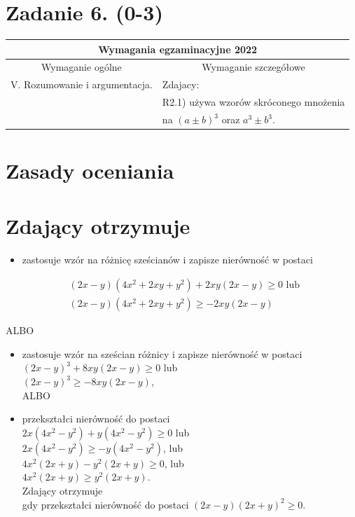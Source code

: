\documentclass[10pt]{article}
\begin{document}
\section*{Zadanie 6. (0-3)}
\begin{center}
\begin{tabular}{|l|l|}
\hline
\multicolumn{2}{|c|}{Wymagania egzaminacyjne 2022} \\
\hline
\multicolumn{1}{|c|}{Wymaganie ogólne} & \multicolumn{1}{c|}{Wymaganie szczegółowe} \\
\hline
V. Rozumowanie i argumentacja. & Zdajacy: \\
 & R2.1) używa wzorów skróconego mnożenia \\
 & na $(a \pm b)^{3}$ oraz $a^{3} \pm b^{3}$. \\
\hline
\end{tabular}
\end{center}

\section*{Zasady oceniania}
\section*{Zdający otrzymuje}
\begin{itemize}
  \item zastosuje wzór na różnicę sześcianów i zapisze nierówność w postaci
\end{itemize}

$$
\begin{aligned}
& (2 x-y)\left(4 x^{2}+2 x y+y^{2}\right)+2 x y(2 x-y) \geq 0 \text { lub } \\
& (2 x-y)\left(4 x^{2}+2 x y+y^{2}\right) \geq-2 x y(2 x-y)
\end{aligned}
$$

ALBO

\begin{itemize}
  \item zastosuje wzór na sześcian różnicy i zapisze nierówność w postaci\\
$(2 x-y)^{3}+8 x y(2 x-y) \geq 0$ lub\\
$(2 x-y)^{3} \geq-8 x y(2 x-y)$,\\
ALBO
  \item przekształci nierówność do postaci\\
$2 x\left(4 x^{2}-y^{2}\right)+y\left(4 x^{2}-y^{2}\right) \geq 0$ lub\\
$2 x\left(4 x^{2}-y^{2}\right) \geq-y\left(4 x^{2}-y^{2}\right)$, lub\\
$4 x^{2}(2 x+y)-y^{2}(2 x+y) \geq 0$, lub\\
$4 x^{2}(2 x+y) \geq y^{2}(2 x+y)$.\\
Zdający otrzymuje\\
gdy przekształci nierówność do postaci $(2 x-y)(2 x+y)^{2} \geq 0$.
\end{itemize}
\end{document}
